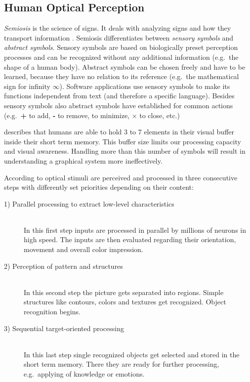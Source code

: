 \documentclass[twoside, openright, 12pt]{book}
\begin{document}
\subsection{Human Optical Perception}
\label{human_optical_perception}
\textit{Semiosis} is the science of signs.
It deals with analyzing signs and how they transport information \citep{Zeckzer14a}.
Semiosis differentiates between \textit{sensory symbols} and \textit{abstract symbols}.
Sensory symbols are based on biologically preset perception processes and can be recognized without any additional information (e.g.~the shape of a human body).
Abstract symbols can be chosen freely and have to be learned, because they have no relation to its reference (e.g.~the mathematical sign for infinity $\infty$).
Software applications use sensory symbols to make its functions independent from text (and therefore a specific language).
Besides sensory symbols also abstract symbols have established for common actions (e.g.~\textbf{+} to add, \textbf{-} to remove, \textbf{ \underline{ }} to minimize, \textbf{$\times$} to close, etc.)

\cite{Zeckzer14a} describes that humans are able to hold 3 to 7 elements in their visual buffer inside their short term memory.
This buffer size limits our processing capacity and visual awareness.
Handling more than this number of symbols will result in understanding a graphical system more ineffectively.

According to \cite{Ware04a} optical stimuli are perceived and processed in three consecutive steps with differently set priorities depending on their content:

\begin{description}
\item[1) Parallel processing to extract low-level characteristics]\hfill \\
In this first step inputs are processed in parallel by millions of neurons in high speed.
The inputs are then evaluated regarding their orientation, movement and overall color impression.

\item[2) Perception of pattern and structures]\hfill \\
In this second step the picture gets separated into regions.
Simple structures like contours, colors and textures get recognized.
Object recognition begins.

\item[3) Sequential target-oriented processing]\hfill \\
In this last step single recognized objects get selected and stored in the short term memory.
There they are ready for further processing, e.g.~applying of knowledge or emotions.
\end{description}
\end{document}

